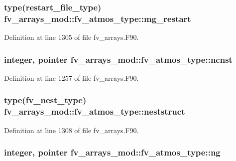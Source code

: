 \subsubsection[{mg\-\_\-restart}]{\setlength{\rightskip}{0pt plus 5cm}type(restart\-\_\-file\-\_\-type) fv\-\_\-arrays\-\_\-mod\-::fv\-\_\-atmos\-\_\-type\-::mg\-\_\-restart}\label{structfv__arrays__mod_1_1fv__atmos__type_a80c75e3c3ef687cdfed8ab388c243dc2}


Definition at line 1305 of file fv\-\_\-arrays.\-F90.

\subsubsection[{ncnst}]{\setlength{\rightskip}{0pt plus 5cm}integer, pointer fv\-\_\-arrays\-\_\-mod\-::fv\-\_\-atmos\-\_\-type\-::ncnst}\label{structfv__arrays__mod_1_1fv__atmos__type_abb783b1c9289305b504854b91bdd8356}


Definition at line 1257 of file fv\-\_\-arrays.\-F90.

\subsubsection[{neststruct}]{\setlength{\rightskip}{0pt plus 5cm}type({\bf fv\-\_\-nest\-\_\-type}) fv\-\_\-arrays\-\_\-mod\-::fv\-\_\-atmos\-\_\-type\-::neststruct}\label{structfv__arrays__mod_1_1fv__atmos__type_a0de20030b672c84ef5f1eec9360ccf61}


Definition at line 1308 of file fv\-\_\-arrays.\-F90.

\subsubsection[{ng}]{\setlength{\rightskip}{0pt plus 5cm}integer, pointer fv\-\_\-arrays\-\_\-mod\-::fv\-\_\-atmos\-\_\-type\-::ng}\label{structfv__arrays__mod_1_1fv__atmos__type_ac30aa7aa79c3ce8965781354a6cccfdd}


